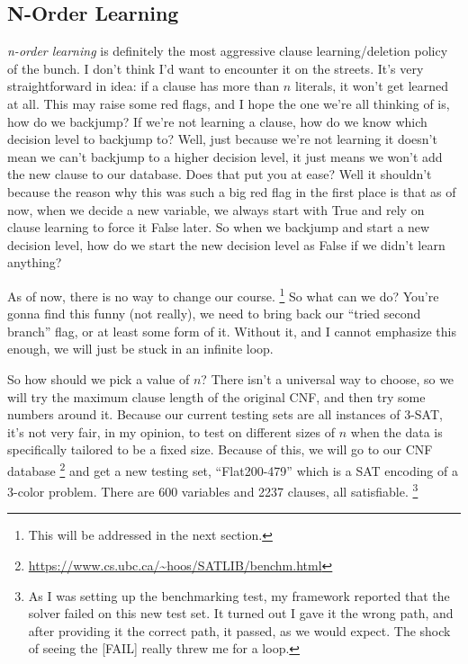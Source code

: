 \documentclass[oneside]{book}
\begin{document}
\subsection{N-Order Learning}

\textit{n-order learning} is definitely the most aggressive clause learning/deletion policy of 
the bunch. I don't think I'd want to encounter it on the streets. It's very straightforward in 
idea: if a clause has more than $n$ literals, it won't get learned at all. This may raise some red 
flags, and I hope the one we're all thinking of is, how do we backjump? If we're not learning a clause, 
how do we know which decision level to backjump to? Well, just because we're not learning it doesn't 
mean we can't backjump to a higher decision level, it just means we won't add the new clause to our 
database. Does that put you at ease? Well it shouldn't because the reason why this was such a big 
red flag in the first place is that as of now, when we decide a new variable, we always start with 
True and rely on clause learning to force it False later. So when we backjump and start a new 
decision level, how do we start the new decision level as False if we didn't learn anything?

As of now, there is no way to change our course.
\footnote{This will be addressed in the next section.}
So what can we do? You're gonna find this funny (not really), we need to bring back our 
``tried second branch'' flag, or at least some form of it. Without it, and I cannot emphasize 
this enough, we will just be stuck in an infinite loop.

So how should we pick a value of $n$? There isn't a universal way to choose, so we will try 
the maximum clause length of the original CNF, and then try some numbers around it. Because 
our current testing sets are all instances of 3-SAT, it's not very fair, in my opinion, to 
test on different sizes of $n$ when the data is specifically tailored to be a fixed size. Because 
of this, we will go to our CNF database 
\footnote{\url{https://www.cs.ubc.ca/~hoos/SATLIB/benchm.html}}
and get a new testing set, ``Flat200-479'' which is a SAT encoding of a 3-color problem. There are 
600 variables and 2237 clauses, all satisfiable.
\footnote{As I was setting up the benchmarking test, my framework reported that the solver failed on 
this new test set. It turned out I gave it the wrong path, and after providing it the correct path, it 
passed, as we would expect. The shock of seeing the [FAIL] really threw me for a loop.}
\end{document}
